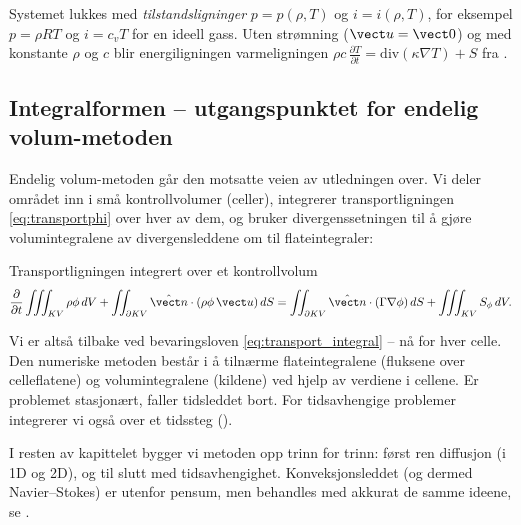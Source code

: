 Systemet lukkes med \emph{tilstandsligninger} $p=p(\rho,T)$ og $i=i(\rho,T)$, for eksempel $p=\rho RT$ og $i=c_vT$ for en ideell gass. Uten strømning ($\vect u=\vect 0$) og med konstante $\rho$ og $c$ blir energiligningen varmeligningen $\rho c\,\frac{\partial T}{\partial t} = \text{div}(\kappa\nabla T) + S$ fra .

\subsection*{Integralformen -- utgangspunktet for endelig volum-metoden}
Endelig volum-metoden går den motsatte veien av utledningen over. Vi deler området inn i små kontrollvolumer (celler), integrerer transportligningen \eqref{eq:transportphi} over hver av dem, og bruker divergenssetningen til å gjøre volumintegralene av divergensleddene om til flateintegraler:
\begin{oppsum}{Transportligningen integrert over et kontrollvolum}
\[
\frac{\partial}{\partial t}\iiint_{KV}\rho\phi\,dV + \iint_{\partial KV}\hat{\vect n}\cdot(\rho\phi\,\vect u)\,dS
= \iint_{\partial KV}\hat{\vect n}\cdot(\Gamma\nabla\phi)\,dS + \iiint_{KV}S_\phi\,dV .
\]
\end{oppsum}
Vi er altså tilbake ved bevaringsloven \eqref{eq:transport_integral} -- nå for hver celle. Den numeriske metoden består i å tilnærme flateintegralene (fluksene over celleflatene) og volumintegralene (kildene) ved hjelp av verdiene i cellene. Er problemet stasjonært, faller tidsleddet bort. For tidsavhengige problemer integrerer vi også over et tidssteg ().

I resten av kapittelet bygger vi metoden opp trinn for trinn: først ren diffusjon (i 1D og 2D), og til slutt med tidsavhengighet. Konveksjonsleddet (og dermed Navier--Stokes) er utenfor pensum, men behandles med akkurat de samme ideene, se \cite{VaM07}.

